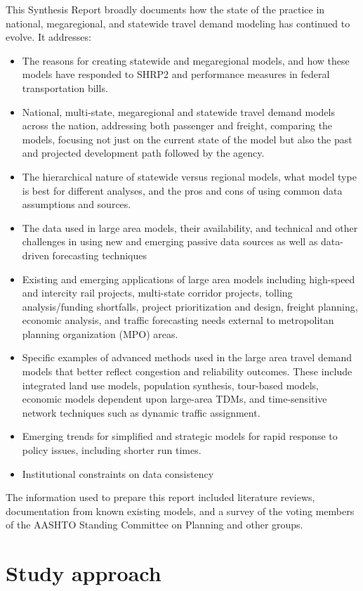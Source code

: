 This Synthesis Report broadly documents how the state of the practice in national, megaregional, and statewide travel demand modeling has continued to evolve. It addresses:
\begin{itemize}
\item The reasons for creating statewide and megaregional models, and how these models have responded to SHRP2 and performance measures in federal transportation bills.
\item National, multi-state, megaregional and statewide travel demand models across the nation, addressing both passenger and freight, comparing the models, focusing not just on the current state of the model but also the past and projected development path followed by the agency.
\item The hierarchical nature of statewide versus regional models, what model type is best for different analyses, and the pros and cons of using common data assumptions and sources.
\item The data used in large area models, their availability, and technical and other challenges in using new and emerging passive data sources as well as data-driven forecasting techniques
\item Existing and emerging applications of large area models including high-speed and intercity rail projects, multi-state corridor projects, tolling analysis/funding shortfalls, project prioritization and design, freight planning, economic analysis, and traffic forecasting needs external to metropolitan planning organization (MPO) areas.
\item Specific examples of advanced methods used in the large area travel demand models that better reflect congestion and reliability outcomes. These include integrated land use models, population synthesis, tour-based models, economic models dependent upon large-area TDMs, and time-sensitive network techniques such as dynamic traffic assignment.
\item   Emerging trends for simplified and strategic models for rapid response to policy issues, including shorter run times.
\item Institutional constraints on data consistency
\end{itemize}

The information used to prepare this report included literature reviews, documentation from known existing models, and a survey of the voting members of the AASHTO Standing Committee on Planning and other groups.

\section{Study approach}

